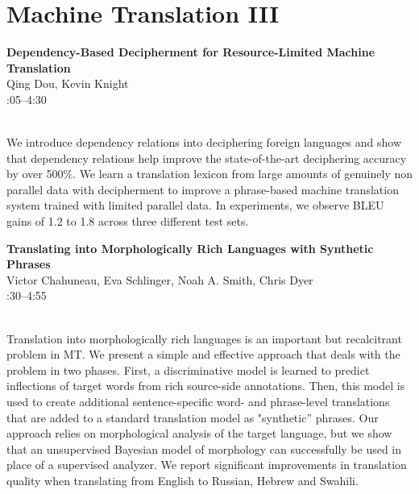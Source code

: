 \documentclass[twoside,makeidx]{book}
\renewcommand{\normalsize}{\fontsize{8}{9}\selectfont}
\renewcommand{\small}{\fontsize{7}{8}\selectfont}
\begin{document}
\section{Machine Translation III}
\vspace{-1em}
\par\vspace{2em}\noindent%
\begin{minipage}{\linewidth}%
\begin{center}
\textbf{\normalsize Dependency-Based Decipherment for Resource-Limited Machine Translation}\\
\normalsize  Qing Dou,  Kevin Knight\\
{\small 4:05--4:30}\\
\end{center}
\end{minipage}\\[0.5em]
\nopagebreak%
\noindent%
{\small We introduce dependency relations into deciphering foreign languages and show that dependency relations help improve the state-of-the-art deciphering accuracy by over 500\%. We learn a translation lexicon from large amounts of genuinely non parallel data with decipherment to improve a phrase-based machine translation system trained with limited parallel data. In experiments, we observe BLEU gains of 1.2 to 1.8 across three different test sets.}
\par\vspace{2em}\noindent%
\begin{minipage}{\linewidth}%
\begin{center}
\textbf{\normalsize Translating into Morphologically Rich Languages with Synthetic Phrases}\\
\normalsize  Victor Chahuneau,  Eva Schlinger,  Noah A. Smith,  Chris Dyer\\
{\small 4:30--4:55}\\
\end{center}
\end{minipage}\\[0.5em]
\nopagebreak%
\noindent%
{\small Translation into morphologically rich languages is an important but recalcitrant problem in MT. We present a simple and effective approach that deals with the problem in two phases. First, a discriminative model is learned to predict inflections of target words from rich source-side annotations. Then, this model is used to create additional sentence-specific word- and phrase-level translations that are added to a standard translation model as "synthetic'' phrases. Our approach relies on morphological analysis of the target language, but we show that an unsupervised Bayesian model of morphology can successfully be used in place of a supervised analyzer. We report significant improvements in translation quality when translating from English to Russian, Hebrew and Swahili.}
\end{document}
